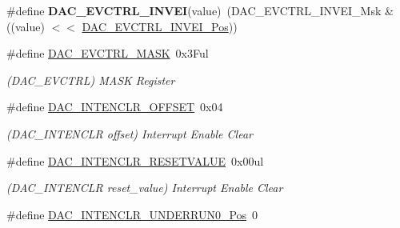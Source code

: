 \begin{DoxyCompactItemize}
\item 
\hypertarget{group___s_a_m_l21___d_a_c_gacca8d551c8bf333ef032192e9e25f60b}{}\#define {\bfseries D\+A\+C\+\_\+\+E\+V\+C\+T\+R\+L\+\_\+\+I\+N\+V\+E\+I}(value)~(D\+A\+C\+\_\+\+E\+V\+C\+T\+R\+L\+\_\+\+I\+N\+V\+E\+I\+\_\+\+Msk \& ((value) $<$$<$ \hyperlink{group___s_a_m_l21___d_a_c_gaefbcfa90869ef66266567b81682f3f0e}{D\+A\+C\+\_\+\+E\+V\+C\+T\+R\+L\+\_\+\+I\+N\+V\+E\+I\+\_\+\+Pos}))\label{group___s_a_m_l21___d_a_c_gacca8d551c8bf333ef032192e9e25f60b}

\item 
\hypertarget{group___s_a_m_l21___d_a_c_ga8290fa8981af7c9f3374d64bfd643575}{}\#define \hyperlink{group___s_a_m_l21___d_a_c_ga8290fa8981af7c9f3374d64bfd643575}{D\+A\+C\+\_\+\+E\+V\+C\+T\+R\+L\+\_\+\+M\+A\+S\+K}~0x3\+Ful\label{group___s_a_m_l21___d_a_c_ga8290fa8981af7c9f3374d64bfd643575}

\begin{DoxyCompactList}\small\item\em (D\+A\+C\+\_\+\+E\+V\+C\+T\+R\+L) M\+A\+S\+K Register \end{DoxyCompactList}\item 
\hypertarget{group___s_a_m_l21___d_a_c_ga4b29525af7de15de08715677c874b359}{}\#define \hyperlink{group___s_a_m_l21___d_a_c_ga4b29525af7de15de08715677c874b359}{D\+A\+C\+\_\+\+I\+N\+T\+E\+N\+C\+L\+R\+\_\+\+O\+F\+F\+S\+E\+T}~0x04\label{group___s_a_m_l21___d_a_c_ga4b29525af7de15de08715677c874b359}

\begin{DoxyCompactList}\small\item\em (D\+A\+C\+\_\+\+I\+N\+T\+E\+N\+C\+L\+R offset) Interrupt Enable Clear \end{DoxyCompactList}\item 
\hypertarget{group___s_a_m_l21___d_a_c_ga0052bdf4a77d5d851ff2dc3981b47f84}{}\#define \hyperlink{group___s_a_m_l21___d_a_c_ga0052bdf4a77d5d851ff2dc3981b47f84}{D\+A\+C\+\_\+\+I\+N\+T\+E\+N\+C\+L\+R\+\_\+\+R\+E\+S\+E\+T\+V\+A\+L\+U\+E}~0x00ul\label{group___s_a_m_l21___d_a_c_ga0052bdf4a77d5d851ff2dc3981b47f84}

\begin{DoxyCompactList}\small\item\em (D\+A\+C\+\_\+\+I\+N\+T\+E\+N\+C\+L\+R reset\+\_\+value) Interrupt Enable Clear \end{DoxyCompactList}\item 
\hypertarget{group___s_a_m_l21___d_a_c_gaf014e05835054e1c9f63e9a4cf8ff275}{}\#define \hyperlink{group___s_a_m_l21___d_a_c_gaf014e05835054e1c9f63e9a4cf8ff275}{D\+A\+C\+\_\+\+I\+N\+T\+E\+N\+C\+L\+R\+\_\+\+U\+N\+D\+E\+R\+R\+U\+N0\+\_\+\+Pos}~0\label{group___s_a_m_l21___d_a_c_gaf014e05835054e1c9f63e9a4cf8ff275}


\end{DoxyCompactItemize}
